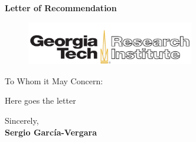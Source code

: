 \documentclass{letter}
\date{}
\newcommand{\Sergio}{\textbf{Sergio Garc\'{i}a-Vergara}}
\begin{document}
\begin{letter}
{
\centering \Large \textbf{Letter of Recommendation}
}

\hfill
\begin{figure}%
    \centering
    \includegraphics[width=0.65\textwidth]{figs/GTRIlogo.jpeg}
\end{figure}

\opening{To Whom it May Concern:} %
\medskip

Here goes the letter

\medskip
Sincerely, \\
\Sergio \\

\end{letter}
\end{document}

